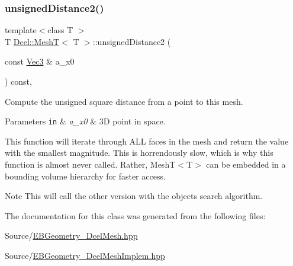 \subsubsection{\texorpdfstring{unsigned\+Distance2()}{unsignedDistance2()}}
{\footnotesize\ttfamily template$<$class T $>$ \\
T \hyperlink{classDcel_1_1MeshT}{Dcel\+::\+MeshT}$<$ T $>$\+::unsigned\+Distance2 (\begin{DoxyParamCaption}\item[{const \hyperlink{classDcel_1_1MeshT_a646c5d8f66b3079bca35fe4186493627}{Vec3} \&}]{a\+\_\+x0 }\end{DoxyParamCaption}) const\hspace{0.3cm}{\ttfamily [inline]}, {\ttfamily [noexcept]}}



Compute the unsigned square distance from a point to this mesh. 


\begin{DoxyParams}[1]{Parameters}
\mbox{\tt in}  & {\em a\+\_\+x0} & 3D point in space.\\
\hline
\end{DoxyParams}
This function will iterate through A\+LL faces in the mesh and return the value with the smallest magnitude. This is horrendously slow, which is why this function is almost never called. Rather, Mesh\+T$<$\+T$>$ can be embedded in a bounding volume hierarchy for faster access. \begin{DoxyNote}{Note}
This will call the other version with the object\textquotesingle{}s search algorithm. 
\end{DoxyNote}


The documentation for this class was generated from the following files\+:\begin{DoxyCompactItemize}
\item 
Source/\hyperlink{EBGeometry__DcelMesh_8hpp}{E\+B\+Geometry\+\_\+\+Dcel\+Mesh.\+hpp}\item 
Source/\hyperlink{EBGeometry__DcelMeshImplem_8hpp}{E\+B\+Geometry\+\_\+\+Dcel\+Mesh\+Implem.\+hpp}\end{DoxyCompactItemize}
